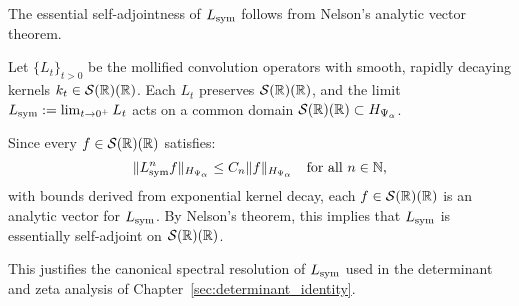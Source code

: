 \begin{remark}
\label{rem:selfadjoint_analytic_vectors}
The essential self-adjointness of \( L_{\mathrm{sym}} \) follows from Nelson’s analytic vector theorem.

\medskip

Let \( \{L_t\}_{t > 0} \) be the mollified convolution operators with smooth, rapidly decaying kernels \( k_t \in \mathcal{S}(\mathbb{R})(\mathbb{R}) \). Each \( L_t \) preserves \( \mathcal{S}(\mathbb{R})(\mathbb{R}) \), and the limit \( L_{\mathrm{sym}} := \lim_{t \to 0^+} L_t \) acts on a common domain \( \mathcal{S}(\mathbb{R})(\mathbb{R}) \subset H_{\Psi_\alpha} \).

\medskip

Since every \( f \in \mathcal{S}(\mathbb{R})(\mathbb{R}) \) satisfies:
\[
\|L_{\mathrm{sym}}^n f\|_{H_{\Psi_\alpha}} \le C_n \|f\|_{H_{\Psi_\alpha}} \quad \text{for all } n \in \mathbb{N},
\]
with bounds derived from exponential kernel decay, each \( f \in \mathcal{S}(\mathbb{R})(\mathbb{R}) \) is an analytic vector for \( L_{\mathrm{sym}} \). By Nelson’s theorem, this implies that \( L_{\mathrm{sym}} \) is essentially self-adjoint on \( \mathcal{S}(\mathbb{R})(\mathbb{R}) \).

\medskip

This justifies the canonical spectral resolution of \( L_{\mathrm{sym}} \) used in the determinant and zeta analysis of Chapter~\ref{sec:determinant_identity}.
\end{remark}
